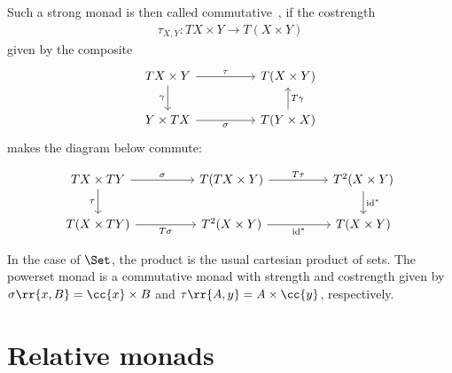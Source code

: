 Such a strong monad is then called commutative~\cite{kock1970}, if the costrength
\begin{align*}
  \tau_{X,Y}:TX\times Y\to T(X\times Y)
\end{align*}
given by the composite
\begin{equation}
  \begin{tikzcd}
    {TX\times Y} && {T(X\times Y)} \\
    {Y\times TX} && {T(Y\times X)}
    \arrow["\sigma"', from=2-1, to=2-3]
    \arrow["T\gamma"', from=2-3, to=1-3]
    \arrow["\gamma"', from=1-1, to=2-1]
    \arrow["\tau", from=1-1, to=1-3]
  \end{tikzcd}
\end{equation}
makes the diagram below commute:

\begin{equation}\label{eq:commutative_monad}
  \begin{tikzcd}
    {TX\times TY} && {T(TX\times Y)} && {T^2(X\times Y)} \\
    {T(X\times TY)} && {T^2(X\times Y)} && {T(X\times Y)}
    \arrow["\tau"', from=1-1, to=2-1]
    \arrow["\sigma", from=1-1, to=1-3]
    \arrow["T\tau", from=1-3, to=1-5]
    \arrow["T\sigma"', from=2-1, to=2-3]
    \arrow["{\text{id}^*}"', from=2-3, to=2-5]
    \arrow["{\text{id}^*}", from=1-5, to=2-5]
  \end{tikzcd}
\end{equation}

\begin{example}
  In the case of $\Set$, the product is the usual cartesian product of sets. The powerset
  monad is a commutative monad with strength and costrength given by
  $\sigma\rr{x,B}=\cc{x}\times B$ and $\tau\rr{A,y}=A\times\cc{y}$, respectively.
\end{example}

\section{Relative monads}

